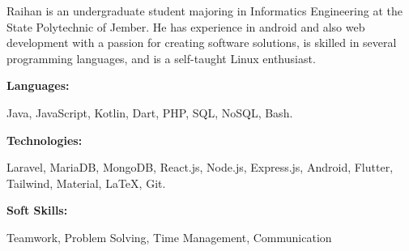 \documentclass[9pt]{developercv} %
\begin{document}
\begin{minipage}[t]{0.46\textwidth}
	\vspace{-6pt}

	Raihan is an undergraduate student majoring in Informatics Engineering at the State Polytechnic of Jember. He has experience in android and also web development with a passion for creating software solutions, is skilled in several programming languages, and is a self-taught Linux enthusiast.

\end{minipage}
\hfill %
\begin{minipage}[t]{0.465\textwidth}
	\vspace{-6pt}

	\begin{minipage}[t]{0.2\textwidth}
		\textbf{Languages:}
	\end{minipage}
	\hfill
	\begin{minipage}[t]{0.73\textwidth}
		Java, JavaScript, Kotlin, Dart, PHP, SQL, NoSQL, Bash.
	\end{minipage}
	\vspace{4mm}

	\begin{minipage}[t]{0.2\textwidth}
		\textbf{Technologies:}
	\end{minipage}
	\hfill
	\begin{minipage}[t]{0.73\textwidth}
		Laravel, MariaDB, MongoDB, React.js, Node.js, Express.js, Android, Flutter, Tailwind, Material, LaTeX, Git.
	\end{minipage}
	\vspace{2mm}

	\begin{minipage}[t]{0.2\textwidth}
		\textbf{Soft Skills:}
	\end{minipage}
	\hfill
	\begin{minipage}[t]{0.73\textwidth}
		Teamwork, Problem Solving, Time Management, Communication
	\end{minipage}

\end{minipage}
\end{document}
